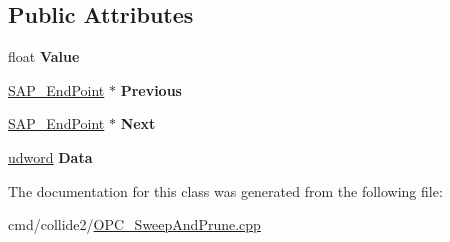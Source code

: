 \subsection*{Public Attributes}
\begin{DoxyCompactItemize}
\item 
float {\bfseries Value}\hypertarget{classOpcode_1_1SAP__EndPoint_aaf2efa4eaf701b0cd14ce72501782e90}{}\label{classOpcode_1_1SAP__EndPoint_aaf2efa4eaf701b0cd14ce72501782e90}

\item 
\hyperlink{classOpcode_1_1SAP__EndPoint}{S\+A\+P\+\_\+\+End\+Point} $\ast$ {\bfseries Previous}\hypertarget{classOpcode_1_1SAP__EndPoint_a94efd616f64d1b4753d4eba43186c652}{}\label{classOpcode_1_1SAP__EndPoint_a94efd616f64d1b4753d4eba43186c652}

\item 
\hyperlink{classOpcode_1_1SAP__EndPoint}{S\+A\+P\+\_\+\+End\+Point} $\ast$ {\bfseries Next}\hypertarget{classOpcode_1_1SAP__EndPoint_ab43dbb475578c2d3170d94d35e694b4f}{}\label{classOpcode_1_1SAP__EndPoint_ab43dbb475578c2d3170d94d35e694b4f}

\item 
\hyperlink{IceTypes_8h_a44c6f1920ba5551225fb534f9d1a1733}{udword} {\bfseries Data}\hypertarget{classOpcode_1_1SAP__EndPoint_a1291861cb8e8a8b916e1722f3ac80d82}{}\label{classOpcode_1_1SAP__EndPoint_a1291861cb8e8a8b916e1722f3ac80d82}

\end{DoxyCompactItemize}


The documentation for this class was generated from the following file\+:\begin{DoxyCompactItemize}
\item 
cmd/collide2/\hyperlink{OPC__SweepAndPrune_8cpp}{O\+P\+C\+\_\+\+Sweep\+And\+Prune.\+cpp}\end{DoxyCompactItemize}
